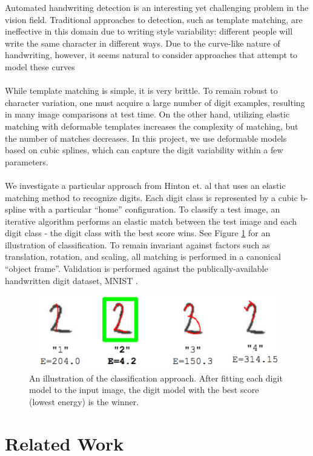 \documentclass[oribibl]{llncs}
\begin{document}
Automated handwriting detection is an interesting yet challenging problem in the vision field. Traditional approaches to detection, such as template matching, are ineffective in this domain due to writing style variability: different people will write the same character in  different ways. Due to the curve-like nature of handwriting, however, it seems natural to consider approaches that attempt to model these curves  
\\
\\
While template matching is simple, it is very brittle. To remain robust to character variation, one must acquire a large number of digit examples, resulting in many image comparisons at test time.
On the other hand, utilizing elastic matching with deformable templates increases the complexity of matching, but the number of matches decreases. In this project, we use deformable models based on cubic splines, which can capture the digit variability within a few parameters.
\\
\\
We investigate a particular approach from Hinton et. al \cite{Hinton92adaptiveelastic} that uses an elastic matching method to recognize digits. Each digit class is represented by a cubic b-spline with a particular ``home'' configuration. To classify a test image, an iterative algorithm performs an elastic match between the test image and each digit class - the digit class with the best score wins. See Figure \ref{fig:bestFitEg} for an illustration of classification. To remain invariant against factors such as translation, rotation, and scaling, all matching is performed in a canonical ``object frame''. Validation is performed against the publically-available handwritten digit dataset, MNIST \cite{mnist}.

\begin{figure}
\centering
\includegraphics[height=3.25cm , width=12cm ]{bestFitEg}
\caption[]{An illustration of the classification approach. After fitting each digit model to the input image, the digit model with the best score (lowest energy) is the winner.} 
\label{fig:bestFitEg}
\end{figure}

\section{Related Work}
 
\end{document}
